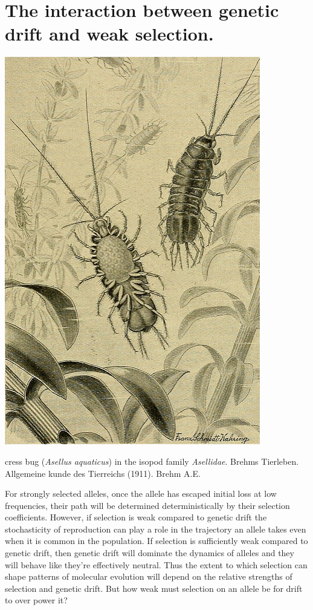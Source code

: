 \section{The interaction between genetic drift and weak selection.}
 \begin{marginfigure}
 \begin{center}
 \includegraphics[width=0.7 \textwidth]{illustration_images/Genetic_drift_selection/Isopod_Asellidae/20406697312_1a9aa75024_z.jpg}
 \end{center}
 \caption{cress bug ({\it Asellus aquaticus}) in the isopod family
   {\it Asellidae}. Brehms Tierleben. Allgemeine kunde des Tierreichs (1911).  Brehm A.E.} \label{fig: asellid_isopod}
 \end{marginfigure}
For strongly selected alleles, once the allele has escaped initial
loss at low frequencies, their path will be determined deterministically by their
selection coefficients. However, if selection is weak compared to
genetic drift the stochasticity of reproduction can play a role in the trajectory an
allele takes even when it is common in the population. If selection is
sufficiently weak compared to genetic drift, then genetic drift will dominate the dynamics of alleles
and they will behave like they're effectively neutral. Thus the extent
to which selection can shape patterns of molecular evolution will
depend on the relative strengths of selection and genetic drift.
But how weak must selection on an allele be for drift to over power
it? 

